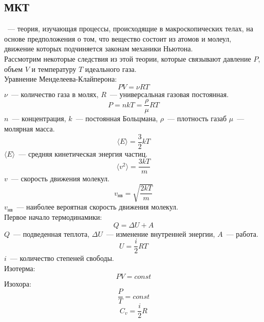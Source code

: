 \subsection{МКТ}
~--- теория, изучающая процессы, происходящие в макроскопических телах, на основе предположения о том, что вещество состоит из атомов и молеул, движение которых подчиняется законам механики Ньютона.\\
Рассмотрим некоторые следствия из этой теории, которые связывают давление $P$, объем $V$ и температуру $T$ идеального газа.\\
Уравнение Менделеева-Клайперона:
\begin{equation}
PV = \nu R T 
\end{equation}
$\nu$~--- количество газа в молях, $R$~--- универсальная газовая постоянная.
\begin{equation}
P = nkT =  \frac{\rho}{\mu}RT
\end{equation}
$n$~--- концентрация, $k$~--- постоянная Больцмана, $\rho$~--- плотность газаб $\mu$~--- молярная масса.
\begin{equation}
\langle E \rangle = \frac{3}{2}kT
\end{equation}
$\langle E \rangle$~--- средняя кинетическая энергия частиц.
\begin{equation}
\langle v^2 \rangle = \frac{3kT}{m}
\end{equation}
$v$~--- скорость движения молекул.
\begin{equation}
v_\text{нв} = \sqrt{\frac{2kT}{m}}
\end{equation}
$v_\text{нв}$~--- наиболее вероятная скорость движения молекул.\\
Первое начало термодинамики:
\begin{equation}
Q = \Delta U + A
\end{equation}
$Q$~--- подведенная теплота, $\Delta U$~--- изменение внутренней энергии, $A$~--- работа.\\
\begin{equation}
U = \frac{i}{2}RT
\end{equation}
$i$~--- количество степеней свободы.\\
Изотерма:
\begin{equation}
PV = const
\end{equation}
Изохора:
\begin{equation}
\frac{P}{T} = const
\end{equation}
\begin{equation}
C_v = \frac{i}{2}R
\end{equation}
